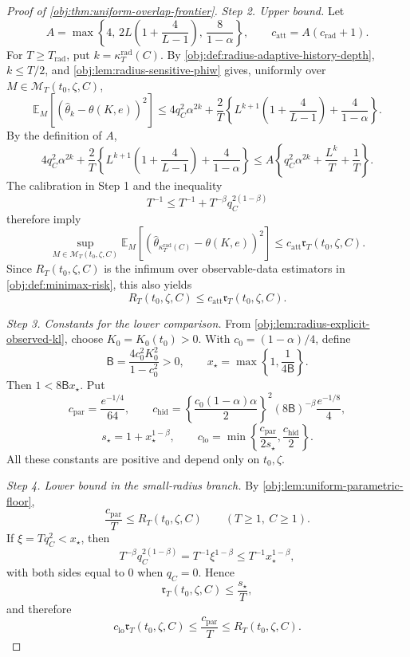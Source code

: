 \documentclass[11pt]{article}
\begin{document}
\begin{proof}[Proof of \cref{obj:thm:uniform-overlap-frontier}]
\emph{Step 2. Upper bound.}
Let
\[
A=\max\left\{
4,\,
2L\left(1+\frac4{L-1}\right),\,
\frac8{1-\alpha}
\right\},
\qquad
c_{\mathrm{att}}=A(c_{\mathrm{rad}}+1).
\]
For \(T\ge T_{\mathrm{rad}}\), put \(k=\kappa_T^{\mathrm{rad}}(C)\).  By
\cref{obj:def:radius-adaptive-history-depth}, \(k\le T/2\), and
\cref{obj:lem:radius-sensitive-phiw} gives, uniformly over
\(M\in\mathcal M_T(t_0,\zeta,C)\),
\[
\mathbb E_M[(\widehat\theta_k-\theta(K,e))^2]
\le
4q_C^2\alpha^{2k}
+\frac2T\left\{
L^{k+1}\left(1+\frac4{L-1}\right)+\frac4{1-\alpha}
\right\}.
\]
By the definition of \(A\),
\[
4q_C^2\alpha^{2k}
+\frac2T\left\{
L^{k+1}\left(1+\frac4{L-1}\right)+\frac4{1-\alpha}
\right\}
\le
A\left\{
q_C^2\alpha^{2k}+\frac{L^k}{T}+\frac1T
\right\}.
\]
The calibration in Step 1 and the inequality
\[
T^{-1}\le T^{-1}+T^{-\beta}q_C^{2(1-\beta)}
\]
therefore imply
\[
\sup_{M\in\mathcal M_T(t_0,\zeta,C)}
\mathbb E_M[(\widehat\theta_{\kappa_T^{\mathrm{rad}}(C)}-\theta(K,e))^2]
\le
c_{\mathrm{att}}\mathfrak r_T(t_0,\zeta,C).
\]
Since \(R_T(t_0,\zeta,C)\) is the infimum over observable-data estimators in
\cref{obj:def:minimax-risk}, this also yields
\[
R_T(t_0,\zeta,C)\le c_{\mathrm{att}}\mathfrak r_T(t_0,\zeta,C).
\] %

\emph{Step 3. Constants for the lower comparison.}
From \cref{obj:lem:radius-explicit-observed-kl}, choose
\(K_0=K_0(t_0)>0\).  With \(c_0=(1-\alpha)/4\), define
\[
\mathsf B=\frac{4c_0^2K_0^2}{1-c_0^2}>0,
\qquad
x_\star=\max\left\{1,\frac1{4\mathsf B}\right\}.
\]
Then \(1<8\mathsf Bx_\star\).  Put
\[
c_{\mathrm{par}}=\frac{e^{-1/4}}{64},
\qquad
c_{\mathrm{hid}}
=
\left\{\frac{c_0(1-\alpha)\alpha}{2}\right\}^2
(8\mathsf B)^{-\beta}\frac{e^{-1/8}}4,
\]
\[
s_\star=1+x_\star^{1-\beta},
\qquad
c_{\mathrm{lo}}
=
\min\left\{\frac{c_{\mathrm{par}}}{2s_\star},
\frac{c_{\mathrm{hid}}}{2}\right\}.
\]
All these constants are positive and depend only on \(t_0,\zeta\). %

\emph{Step 4. Lower bound in the small-radius branch.}
By \cref{obj:lem:uniform-parametric-floor},
\[
\frac{c_{\mathrm{par}}}{T}\le R_T(t_0,\zeta,C)
\qquad (T\ge1,\ C\ge1).
\]
If \(\xi=Tq_C^2<x_\star\), then
\[
T^{-\beta}q_C^{2(1-\beta)}
=
T^{-1}\xi^{1-\beta}
\le
T^{-1}x_\star^{1-\beta},
\]
with both sides equal to \(0\) when \(q_C=0\). Hence
\[
\mathfrak r_T(t_0,\zeta,C)
\le
\frac{s_\star}{T},
\]
and therefore
\[
c_{\mathrm{lo}}\mathfrak r_T(t_0,\zeta,C)
\le
\frac{c_{\mathrm{par}}}{T}
\le
R_T(t_0,\zeta,C).
\] %


\end{proof}
\end{document}
